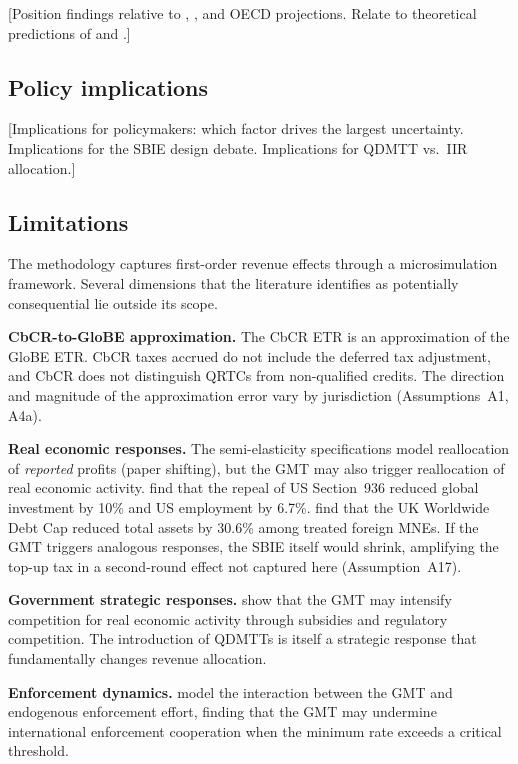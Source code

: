 \documentclass[11pt,a4paper]{article}
\begin{document}
[Position findings relative to \citet{barake2022}, \citet{hugger2026}, and OECD projections. Relate to theoretical predictions of \citet{schjelderup2024} and \citet{johannesen2022}.]

\subsection{Policy implications}\label{sec:implications}

[Implications for policymakers: which factor drives the largest uncertainty. Implications for the SBIE design debate. Implications for QDMTT vs.\ IIR allocation.]

\subsection{Limitations}\label{sec:limitations}

The methodology captures first-order revenue effects through a microsimulation framework. Several dimensions that the literature identifies as potentially consequential lie outside its scope.

\textbf{CbCR-to-GloBE approximation.} The CbCR ETR is an approximation of the GloBE ETR. CbCR taxes accrued do not include the deferred tax adjustment, and CbCR does not distinguish QRTCs from non-qualified credits. The direction and magnitude of the approximation error vary by jurisdiction (Assumptions~A1, A4a).

\textbf{Real economic responses.} The semi-elasticity specifications model reallocation of \emph{reported} profits (paper shifting), but the GMT may also trigger reallocation of real economic activity. \citet{suarezserrato2018} find that the repeal of US Section~936 reduced global investment by 10\% and US employment by 6.7\%. \citet{bilicka2022} find that the UK Worldwide Debt Cap reduced total assets by 30.6\% among treated foreign MNEs. If the GMT triggers analogous responses, the SBIE itself would shrink, amplifying the top-up tax in a second-round effect not captured here (Assumption~A17).

\textbf{Government strategic responses.} \citet{janeba2023} show that the GMT may intensify competition for real economic activity through subsidies and regulatory competition. The introduction of QDMTTs is itself a strategic response that fundamentally changes revenue allocation.

\textbf{Enforcement dynamics.} \citet{jean2026} model the interaction between the GMT and endogenous enforcement effort, finding that the GMT may undermine international enforcement cooperation when the minimum rate exceeds a critical threshold.
\end{document}
